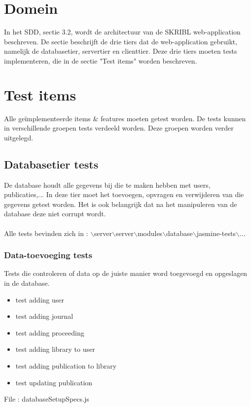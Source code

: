 \documentclass{article}
\begin{document}
\section{Domein}
In het SDD, sectie 3.2, wordt de architectuur van de SKRIBL web-application beschreven. De sectie beschrijft de drie tiers dat de web-application gebruikt, namelijk de databasetier, servertier en clienttier. Deze drie tiers moeten tests implementeren, die in de sectie "Test items" worden beschreven.

\section{Test items}
Alle ge\"implementeerde items \& features moeten getest worden. De tests kunnen in verschillende groepen tests verdeeld worden. Deze groepen worden verder uitgelegd.

\subsection{Databasetier tests}
De database houdt alle gegevens bij die te maken hebben met users, publicaties,... In deze tier moet het toevoegen, opvragen en verwijderen van die gegevens getest worden. Het is ook belangrijk dat na het manipuleren van de database deze niet corrupt wordt.
\\
\\
Alle tests bevinden zich in : $\backslash$server$\backslash$server$\backslash$modules$\backslash$database$\backslash$jasmine-tests$\backslash$...
\subsubsection{Data-toevoeging tests}
Tests die controleren of data op de juiste manier word toegevoegd en opgeslagen in de database.
\begin{itemize}
\item test adding user
\item test adding journal 
\item test adding proceeding
\item test adding library to user
\item test adding publication to library
\item test updating publication
\end{itemize}
File : databaseSetupSpecs.js
\end{document}
